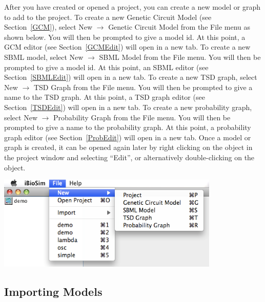 \documentclass[titlepage,11pt]{article}
\begin{document}
\noindent
After you have created or opened a project, you can create a
new model or graph to add to the project.  To create a new 
Genetic Circuit Model (see Section~\ref{GCM}), select 
New $\rightarrow$ Genetic Circuit Model from the
File menu as shown below. You will then be prompted to give a model id. At this
point, a GCM editor (see Section~\ref{GCMEdit}) will open in a new
tab. To create a new SBML model, select New $\rightarrow$ SBML Model
from the File menu. You will then be prompted to give a model id.
At this point, an SBML editor (see Section~\ref{SBMLEdit}) will open
in a new tab. To create a new TSD graph, select New $\rightarrow$ TSD Graph
from the File menu. You will then be prompted to give a name to
the TSD graph.  At this point, a TSD graph editor (see Section~\ref{TSDEdit})
will open in a new tab. To create a new probability graph, select 
New $\rightarrow$ Probability Graph from the File menu. You will then
be prompted to give a name to the probability graph. At this point, a 
probability graph editor (see Section~\ref{ProbEdit})
will open in a new tab. Once a model or graph is created, it can
be opened again later by right clicking on the object in the
project window and selecting ``Edit'', or alternatively
double-clicking on the object.
\begin{center}
\includegraphics[height=45mm]{screenshots/newModel}
\end{center}

\subsection{Importing Models}
\end{document}
